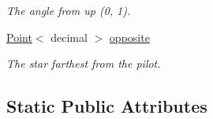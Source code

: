 \begin{DoxyCompactItemize}
\begin{DoxyCompactList}\small\item\em The angle from up (0, 1). \end{DoxyCompactList}\item 
\mbox{\label{classstar__tracker_1_1StarSet_aaefbde2ed32000e0d4a9a8104a685f0f}} 
\hyperlink{classutil_1_1Point}{Point}$<$ decimal $>$ \hyperlink{classstar__tracker_1_1StarSet_aaefbde2ed32000e0d4a9a8104a685f0f}{opposite}
\begin{DoxyCompactList}\small\item\em The star farthest from the pilot. \end{DoxyCompactList}\end{DoxyCompactItemize}
\subsection*{Static Public Attributes}

